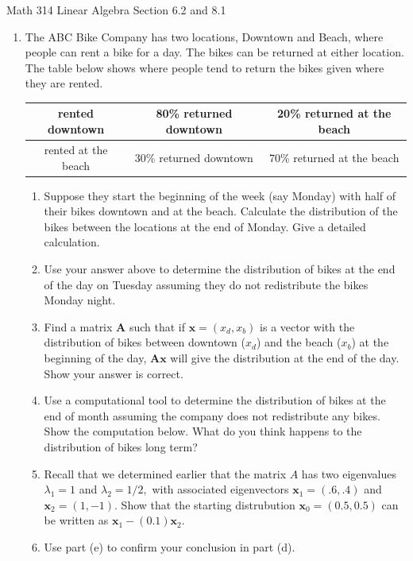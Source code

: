 \documentclass[12pt]{amsart}
\newcommand{\bA}{\mathbf{A}}
\newcommand{\bx}{\mathbf{x}}
\begin{document}
\scriptsize \noindent Math 314 Linear Algebra \hfill Section 6.2 and 8.1
\normalsize\medskip


\thispagestyle{empty}
\begin{enumerate}
\item The ABC Bike Company has two locations, Downtown and Beach, where people can rent a bike for a day. The bikes can be returned at either location. The table below shows where people tend to return the bikes given where they are rented.\\
\begin{tabular}{|c||cc|}
\hline
rented downtown& 80\% returned downtown & 20\% returned at the beach\\
\hline
rented at the beach& 30\% returned downtown & 70\% returned at the beach\\
\hline
\end{tabular}
	\begin{enumerate}
	\item Suppose they start the beginning of the week (say Monday) with half of their bikes downtown and at the beach. Calculate the distribution of the bikes between the locations at the end of Monday. Give a detailed calculation.
	\vfill
	\item Use your answer above to determine the distribution of bikes at the end of the day on Tuesday assuming they do not redistribute the bikes Monday night.
	\vfill
	\item Find a matrix $\bA$ such that if $\bx = (x_d,x_b)$ is a vector with the distribution of bikes between downtown ($x_d$) and the beach ($x_b$) at the beginning of the day, $\bA \bx$ will give the distribution at the end of the day. Show your answer is correct. 
	\vfill
	\item Use a computational tool to determine the distribution of bikes at the end of month assuming the company does not redistribute any bikes. Show the computation below. What do you think happens to the distribution of bikes long term?
\vfill
	\item Recall that we determined earlier that the matrix $A$ has two eigenvalues $\lambda_1 =1$ and $\lambda_2= 1/2,$ with associated eigenvectors $\bx_1=(.6,.4)$ and $\bx_2 = (1,-1).$ Show that the starting distrubution $\bx_0=(0.5,0.5)$ can be written as $\bx_1-(0.1)\bx_2.$
	\vfill
	\item Use part (e) to confirm your conclusion in part (d).
	\vfill
	\end{enumerate}
\end{enumerate}
\newpage
\end{document}
